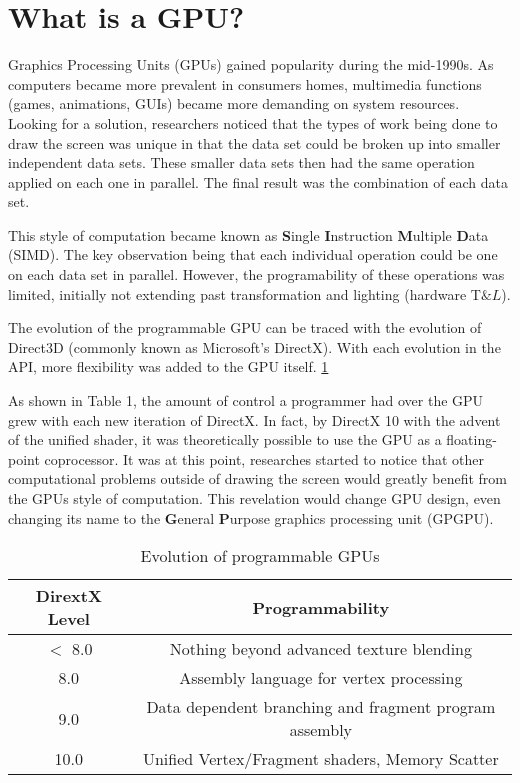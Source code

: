 \section*{What is a GPU?}

Graphics Processing Units (GPUs) gained popularity during the mid-1990s. As computers became more prevalent in consumers homes, multimedia functions (games, animations, GUIs) became more demanding on system resources. Looking for a solution, researchers noticed that the types of work being done to draw the screen was unique in that the data set could be broken up into smaller independent data sets. These smaller data sets then had the same operation applied on each one in parallel. The final result was the combination of each data set. 

This style of computation became known as \textbf{S}ingle \textbf{I}nstruction \textbf{M}ultiple \textbf{D}ata (SIMD). The key observation being that each individual operation could be one on each data set in parallel. However, the programability of these operations was limited, initially not extending past transformation and lighting (hardware T$\&L$). 

The evolution of the programmable GPU can be traced with the evolution of Direct3D (commonly known as Microsoft's DirectX). With each evolution in the API, more flexibility was added to the GPU itself. \ref{tab:gpuevolution}

As shown in Table 1, the amount of control a programmer had over the GPU grew with each new iteration of DirectX. In fact, by DirectX 10 with the advent of the unified shader, it was theoretically possible to use the GPU as a floating-point coprocessor. It was at this point, researches started to notice that other computational problems outside of drawing the screen would greatly benefit from the GPUs style of computation. This revelation would change GPU design, even changing its name to the \textbf{G}eneral \textbf{P}urpose graphics processing unit (GPGPU). \cite{emergingtech}

\begin{table}
	\begin{tabular}{|c|c|}
		\hline
		\textbf{DirextX Level} & \textbf{Programmability} \\
		\hline
		$<$ 8.0 & Nothing beyond advanced texture blending \\
		8.0 & Assembly language for vertex processing \\
		9.0 & Data dependent branching and fragment program assembly\\
		10.0 & Unified Vertex/Fragment shaders, Memory Scatter \\
		\hline
	\end{tabular}
	\caption{Evolution of programmable GPUs}
	\label{tab:gpuevolution}
\end{table}


